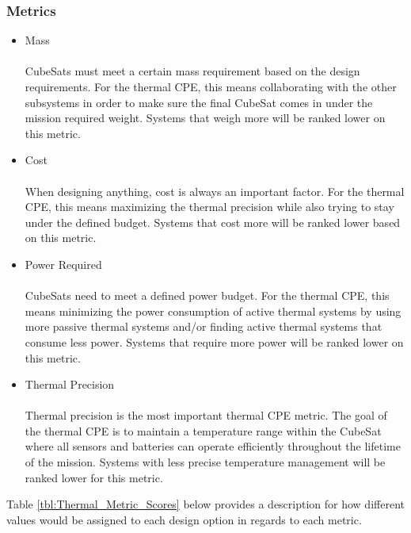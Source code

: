 \subsubsection{Metrics}

\begin{itemize}
   \item Mass \\
   \\
CubeSats must meet a certain mass requirement based on the design requirements. For the thermal CPE, this means collaborating with the other subsystems in order to make sure the final CubeSat comes in under the mission required weight. Systems that weigh more will be ranked lower on this metric.
   \item Cost \\
   \\
When designing anything, cost is always an important factor. For the thermal CPE, this means maximizing the thermal precision while also trying to stay under the  defined budget. Systems that cost more will be ranked lower based on this metric.
   \item Power Required \\
   \\
CubeSats need to meet a defined power budget. For the thermal CPE, this means minimizing the power consumption of active thermal systems by using more passive thermal systems and/or finding active thermal systems that consume less power. Systems that require more power will be ranked lower on this metric.
   \item Thermal Precision \\
   \\
Thermal precision is the most important thermal CPE metric. The goal of the thermal CPE is to maintain a temperature range within the CubeSat where all sensors and batteries can operate efficiently throughout the lifetime of the mission. Systems with less precise temperature management will be ranked lower for this metric.
\end{itemize}

Table \ref{tbl:Thermal_Metric_Scores} below provides a description for how different values would be assigned to each design option in regards to each metric. 

